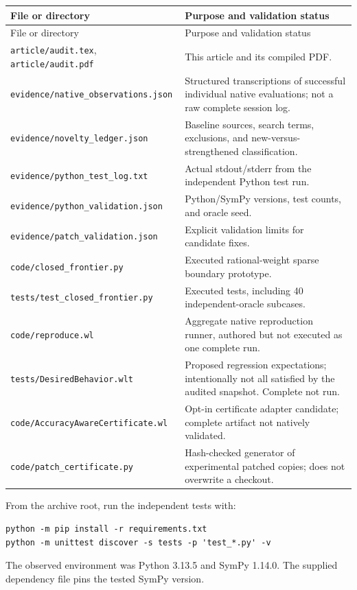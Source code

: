 \documentclass[11pt,letterpaper]{article}
\newcommand{\code}[1]{\texttt{\detokenize{#1}}}
\begin{document}
\begin{longtable}{@{}p{}p{}@{}}
\toprule
File or directory & Purpose and validation status\\
\midrule\endfirsthead
\toprule File or directory & Purpose and validation status\\\midrule\endhead
\nolinkurl{article/audit.tex}, \nolinkurl{article/audit.pdf} & This article and its compiled PDF.\\[5pt]
\nolinkurl{evidence/native_observations.json} & Structured transcriptions of successful individual native evaluations; not a raw complete session log.\\[5pt]
\nolinkurl{evidence/novelty_ledger.json} & Baseline sources, search terms, exclusions, and new-versus-strengthened classification.\\[5pt]
\nolinkurl{evidence/python_test_log.txt} & Actual stdout/stderr from the independent Python test run.\\[5pt]
\nolinkurl{evidence/python_validation.json} & Python/SymPy versions, test counts, and oracle seed.\\[5pt]
\nolinkurl{evidence/patch_validation.json} & Explicit validation limits for candidate fixes.\\[5pt]
\nolinkurl{code/closed_frontier.py} & Executed rational-weight sparse boundary prototype.\\[5pt]
\nolinkurl{tests/test_closed_frontier.py} & Executed tests, including 40 independent-oracle subcases.\\[5pt]
\nolinkurl{code/reproduce.wl} & Aggregate native reproduction runner, authored but not executed as one complete run.\\[5pt]
\nolinkurl{tests/DesiredBehavior.wlt} & Proposed regression expectations; intentionally not all satisfied by the audited snapshot. Complete \code{TestReport} not run.\\[5pt]
\nolinkurl{code/AccuracyAwareCertificate.wl} & Opt-in certificate adapter candidate; complete artifact not natively validated.\\[5pt]
\nolinkurl{code/patch_certificate.py} & Hash-checked generator of experimental patched copies; does not overwrite a checkout.\\
\bottomrule
\end{longtable}

From the archive root, run the independent tests with:
\begin{lstlisting}
python -m pip install -r requirements.txt
python -m unittest discover -s tests -p 'test_*.py' -v
\end{lstlisting}
The observed environment was Python 3.13.5 and SymPy 1.14.0. The supplied dependency file pins the tested SymPy version.
\end{document}
